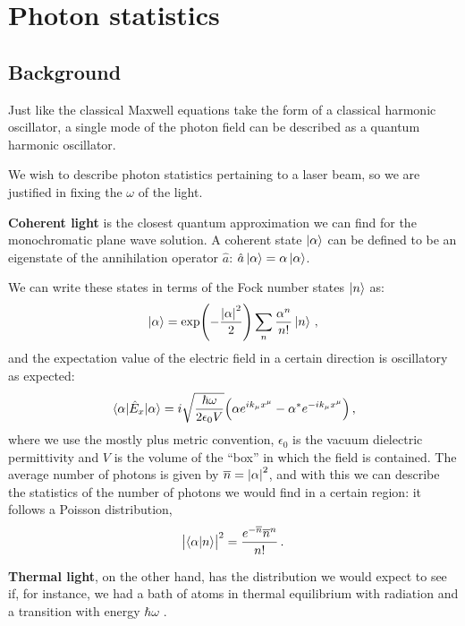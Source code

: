 \documentclass[main.tex]{subfiles}
\begin{document}
\section{Photon statistics}

\subsection{Background}

Just like the classical Maxwell equations take the form of a classical harmonic oscillator, a single mode of the photon field can be described as a quantum harmonic oscillator.

We wish to describe photon statistics pertaining to a laser beam, so we are justified in fixing the \(\omega \) of the light.

\textbf{Coherent light} is the closest quantum approximation we can find for the monochromatic plane wave solution. A coherent state \(\ket{\alpha } \) can be defined to be an eigenstate of the annihilation operator \(\hat{a}\): \(\hat{a} \ket{\alpha } = \alpha \ket{\alpha }\). 

We can write these states in terms of the Fock number states \(\ket{n}\) as: 
%
\begin{align}
\ket{\alpha } = \exp(- \frac{\abs{\alpha }^2}{2}) 
\sum _{n} \frac{\alpha^{n}}{n!} \ket{n}
\,,
\end{align}
%
and the expectation value of the electric field in a certain direction is oscillatory as expected: 
%
\begin{align}
\ev{\hat{E}_x}{\alpha } = i \sqrt{\frac{\hbar \omega }{ 2 \epsilon_0 V}} \qty( \alpha  e^{i k_\mu x^{\mu }} - \alpha^{*} e^{-i k_\mu x^{\mu }} )
\,,
\end{align}
%
where we use the mostly plus metric convention, \(\epsilon_0 \) is the vacuum dielectric permittivity and \(V\) is the volume of the ``box'' in which the field is contained. 
The average number of photons is given by \(\overline{n} = \abs{\alpha }^2\), and with this we can describe the statistics of the number of photons we would find in a certain region: it follows a Poisson distribution, 
%
\begin{align}
\abs{\braket{\alpha }{n}}^2 = \frac{e^{-\overline{n}} \overline{n}^{n}}{n!}
\,.
\end{align}

\textbf{Thermal light}, on the other hand, has the distribution we would expect to see if, for instance, we had a bath of atoms in thermal equilibrium with radiation and a transition with energy \(\hbar \omega \)  \cite[section 14.4]{salehFundamentalsPhotonics}.
\end{document}
